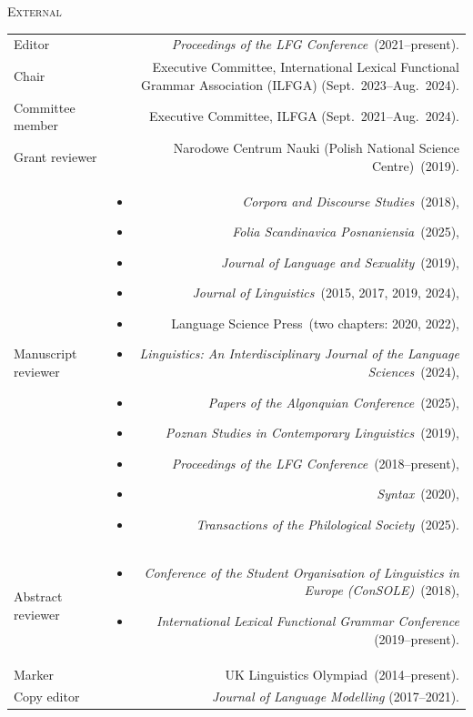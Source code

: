 \documentclass[11pt,a4paper]{article}
\makeatletter
\newlength{\rulelength}%
\newenvironment{cvsection}{%
  \setlength{\extrarowheight}{0.70ex}
  \begin{longtable}[l]{@{} L R @{}}
}{%
  \end{longtable}
}
\newlength{\squish}
\newenvironment{reviewlist}
{%
\vspace*{-8pt}%
\begin{itemize}[noitemsep,label={},nosep,left=0pt .. \parindent]%
}
{%
\end{itemize}
}
\newcommand{\Label}[1]{%
\textnormal{#1}%
}
\newcommand{\cvheading}[1]{\noindent{{\color{headercolor}\rule[0.4ex]{\rulelength}{2pt}\hspace*{9pt} \Large #1}}\vspace*{0.5\baselineskip}}
\newcommand{\cvsubhead}[1]{\noindent\hspace*{\rulelength}\hspace*{9pt} \textsc{#1}\vspace*{0.25\baselineskip}}
\makeatother
\begin{document}

\cvheading{Commissions of trust}

\cvsubhead{External}
\begin{cvsection}
  \Label{Editor} & \textit{Proceedings of the LFG Conference}~(2021--present).\\
  \Label{Chair} & Executive Committee, International Lexical Functional Grammar Association (ILFGA) (Sept.~2023--Aug.~2024).\\ %
  \Label{Committee member} & Executive Committee, ILFGA (Sept.~2021--Aug.~2024).\\
\Label{Grant reviewer} &
                    Narodowe Centrum Nauki (Polish National Science Centre)~(2019).\\
\Label{Manuscript reviewer} &
                \begin{reviewlist}
                \item \textit{Corpora and Discourse Studies}~(2018),
                \item \textit{Folia Scandinavica Posnaniensia}~(2025),
                \item \textit{Journal of Language and Sexuality}~(2019),
                \item \textit{Journal of Linguistics}~(2015, 2017, 2019, 2024),
                \item Language Science Press~(two chapters: 2020, 2022),
                \item \textit{Linguistics: An Interdisciplinary Journal of the Language Sciences}~(2024),
                \item \textit{Papers of the Algonquian Conference}~(2025),
                \item \textit{Poznan Studies in Contemporary Linguistics}~(2019),
                \item \textit{Proceedings of the LFG Conference}~(2018--present),
                \item  \textit{Syntax}~(2020),
                \item \textit{Transactions of the Philological Society}~(2025).
                \end{reviewlist}
                 \\[\squish]
\Label{Abstract reviewer}   &
                \begin{reviewlist}
                \item \textit{Conference of the Student Organisation of Linguistics in Europe (ConSOLE)}~(2018),
                \item \textit{International Lexical Functional Grammar Conference} (2019--present).
                \end{reviewlist}
                \\[\squish]
\Label{Marker}      & UK Linguistics Olympiad~(2014--present).\\
\Label{Copy editor} & \textit{Journal of Language Modelling} (2017--2021).
\end{cvsection}
\end{document}
